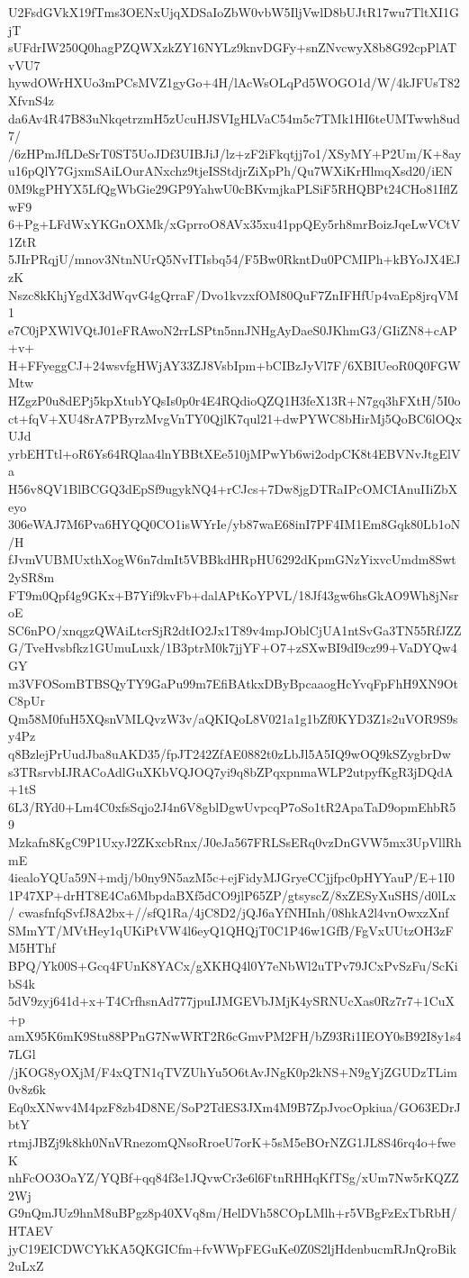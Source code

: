 U2FsdGVkX19fTms3OENxUjqXDSaIoZbW0vbW5IljVwlD8bUJtR17wu7TltXI1GjT
sUFdrIW250Q0hagPZQWXzkZY16NYLz9knvDGFy+snZNvcwyX8b8G92cpPlATvVU7
hywdOWrHXUo3mPCsMVZ1gyGo+4H/lAcWsOLqPd5WOGO1d/W/4kJFUsT82XfvnS4z
da6Av4R47B83uNkqetrzmH5zUcuHJSVIgHLVaC54m5c7TMk1HI6teUMTwwh8ud7/
/6zHPmJfLDeSrT0ST5UoJDf3UIBJiJ/lz+zF2iFkqtjj7o1/XSyMY+P2Um/K+8ay
u16pQlY7GjxmSAiLOurANxchz9tjeISStdjrZiXpPh/Qu7WXiKrHlmqXsd20/iEN
0M9kgPHYX5LfQgWbGie29GP9YahwU0cBKvmjkaPLSiF5RHQBPt24CHo81IflZwF9
6+Pg+LFdWxYKGnOXMk/xGprroO8AVx35xu41ppQEy5rh8mrBoizJqeLwVCtV1ZtR
5JIrPRqjU/mnov3NtnNUrQ5NvITIsbq54/F5Bw0RkntDu0PCMIPh+kBYoJX4EJzK
Nszc8kKhjYgdX3dWqvG4gQrraF/Dvo1kvzxfOM80QuF7ZnIFHfUp4vaEp8jrqVM1
e7C0jPXWlVQtJ01eFRAwoN2rrLSPtn5nnJNHgAyDaeS0JKhmG3/GIiZN8+cAP+v+
H+FFyeggCJ+24wsvfgHWjAY33ZJ8VsbIpm+bCIBzJyVl7F/6XBIUeoR0Q0FGWMtw
HZgzP0u8dEPj5kpXtubYQsIs0p0r4E4RQdioQZQ1H3feX13R+N7gq3hFXtH/5I0o
ct+fqV+XU48rA7PByrzMvgVnTY0QjlK7qul21+dwPYWC8bHirMj5QoBC6lOQxUJd
yrbEHTtl+oR6Ys64RQlaa4lnYBBtXEe510jMPwYb6wi2odpCK8t4EBVNvJtgElVa
H56v8QV1BlBCGQ3dEpSf9ugykNQ4+rCJcs+7Dw8jgDTRaIPcOMCIAnuIIiZbXeyo
306eWAJ7M6Pva6HYQQ0CO1isWYrIe/yb87waE68inI7PF4IM1Em8Gqk80Lb1oN/H
fJvmVUBMUxthXogW6n7dmIt5VBBkdHRpHU6292dKpmGNzYixvcUmdm8Swt2ySR8m
FT9m0Qpf4g9GKx+B7Yif9kvFb+dalAPtKoYPVL/18Jf43gw6hsGkAO9Wh8jNsroE
SC6nPO/xnqgzQWAiLtcrSjR2dtIO2Jx1T89v4mpJOblCjUA1ntSvGa3TN55RfJZZ
G/TveHvsbfkz1GUmuLuxk/1B3ptrM0k7jjYF+O7+zSXwBI9dI9cz99+VaDYQw4GY
m3VFOSomBTBSQyTY9GaPu99m7EfiBAtkxDByBpcaaogHcYvqFpFhH9XN9OtC8pUr
Qm58M0fuH5XQsnVMLQvzW3v/aQKIQoL8V021a1g1bZf0KYD3Z1s2uVOR9S9sy4Pz
q8BzlejPrUudJba8uAKD35/fpJT242ZfAE0882t0zLbJl5A5IQ9wOQ9kSZygbrDw
s3TRsrvbIJRACoAdlGuXKbVQJOQ7yi9q8bZPqxpnmaWLP2utpyfKgR3jDQdA+1tS
6L3/RYd0+Lm4C0xfsSqjo2J4n6V8gblDgwUvpcqP7oSo1tR2ApaTaD9opmEhbR59
Mzkafn8KgC9P1UxyJ2ZKxcbRnx/J0eJa567FRLSsERq0vzDnGVW5mx3UpVllRhmE
4iealoYQUa59N+mdj/b0ny9N5azM5c+ejFidyMJGryeCCjjfpc0pHYYauP/E+1I0
1P47XP+drHT8E4Ca6MbpdaBXf5dCO9jlP65ZP/gtsyscZ/8xZESyXuSHS/d0lLx/
cwasfnfqSvfJ8A2bx+//sfQ1Ra/4jC8D2/jQJ6aYfNHInh/08hkA2l4vnOwxzXnf
SMmYT/MVtHey1qUKiPtVW4l6eyQ1QHQjT0C1P46w1GfB/FgVxUUtzOH3zFM5HThf
BPQ/Yk00S+Gcq4FUnK8YACx/gXKHQ4l0Y7eNbWl2uTPv79JCxPvSzFu/ScKibS4k
5dV9zyj641d+x+T4CrfhsnAd777jpuIJMGEVbJMjK4ySRNUcXas0Rz7r7+1CuX+p
amX95K6mK9Stu88PPnG7NwWRT2R6cGmvPM2FH/bZ93Ri1IEOY0sB92I8y1s47LGl
/jKOG8yOXjM/F4xQTN1qTVZUhYu5O6tAvJNgK0p2kNS+N9gYjZGUDzTLim0v8z6k
Eq0xXNwv4M4pzF8zb4D8NE/SoP2TdES3JXm4M9B7ZpJvocOpkiua/GO63EDrJbtY
rtmjJBZj9k8kh0NnVRnezomQNsoRroeU7orK+5sM5eBOrNZG1JL8S46rq4o+fweK
nhFcOO3OaYZ/YQBf+qq84f3e1JQvwCr3e6l6FtnRHHqKfTSg/xUm7Nw5rKQZZ2Wj
G9nQmJUz9hnM8uBPgz8p40XVq8m/HelDVh58COpLMlh+r5VBgFzExTbRbH/HTAEV
jyC19EICDWCYkKA5QKGICfm+fvWWpFEGuKe0Z0S2ljHdenbucmRJnQroBik2uLxZ
